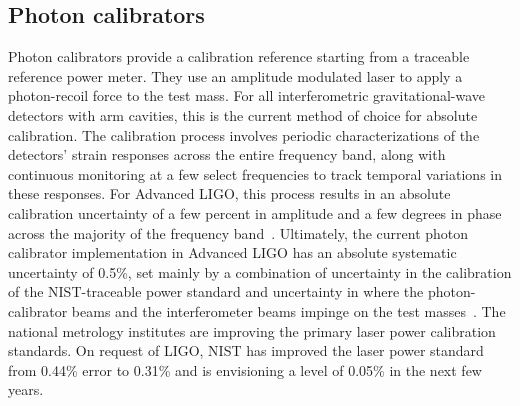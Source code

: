 \subsection{Photon calibrators}
Photon calibrators provide a calibration reference starting from a traceable reference power meter. They use an amplitude modulated laser to apply a photon-recoil force to the test mass. For all interferometric gravitational-wave detectors with arm cavities, this is the current method of choice for absolute calibration.
The calibration process involves periodic characterizations of the detectors' strain responses across the entire frequency band, along with continuous monitoring at a few select frequencies to track temporal variations in these responses.
For Advanced LIGO, this process results in an absolute calibration uncertainty of a few percent in amplitude and a few degrees in phase across the majority of the frequency band~\cite{PhysRevD.96.102001}.
Ultimately, the current photon calibrator implementation in Advanced LIGO has an absolute systematic uncertainty of 0.5\%, set mainly by a combination of uncertainty in the calibration of the NIST-traceable power standard and uncertainty in where the photon-calibrator beams and the interferometer beams impinge on the test masses~\cite{ALIGOPhotCalib2016, NISTWorkshop2019}. The national metrology institutes are improving the primary laser power calibration standards. On request of LIGO, NIST has improved the laser power standard from 0.44\% error to 0.31\% and is envisioning a level of 0.05\% in the next few years.

